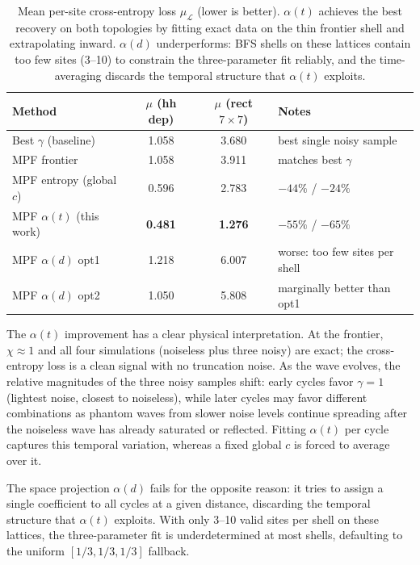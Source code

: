 \documentclass[12pt]{article}
\begin{document}
\begin{table}[h]
\centering
\begin{tabular}{lccl}
\toprule
Method & $\mu$ (hh dep) & $\mu$ (rect $7{\times}7$) & Notes \\
\midrule
Best $\gamma$ (baseline)   & 1.058 & 3.680 & best single noisy sample \\
MPF frontier               & 1.058 & 3.911 & matches best $\gamma$ \\
MPF entropy (global $c$)   & 0.596 & 2.783 & $-44\%$ / $-24\%$ \\
MPF $\alpha(t)$ (this work)& \textbf{0.481} & \textbf{1.276} & $-55\%$ / $-65\%$ \\
MPF $\alpha(d)$ opt1       & 1.218 & 6.007 & worse: too few sites per shell \\
MPF $\alpha(d)$ opt2       & 1.050 & 5.808 & marginally better than opt1 \\
\bottomrule
\end{tabular}
\caption{Mean per-site cross-entropy loss $\mu_\mathcal{L}$ (lower is better).
$\alpha(t)$ achieves the best recovery on both topologies by fitting exact
data on the thin frontier shell and extrapolating inward.
$\alpha(d)$ underperforms: BFS shells on these lattices contain too few
sites (3--10) to constrain the three-parameter fit reliably, and the
time-averaging discards the temporal structure that $\alpha(t)$ exploits.}
\label{tab:alpha_comparison}
\end{table}

The $\alpha(t)$ improvement has a clear physical interpretation.
At the frontier, $\chi\approx1$ and all four simulations (noiseless plus
three noisy) are exact; the cross-entropy loss is a clean signal with no
truncation noise.
As the wave evolves, the relative magnitudes of the three noisy samples
shift: early cycles favor $\gamma=1$ (lightest noise, closest to noiseless),
while later cycles may favor different combinations as phantom waves from
slower noise levels continue spreading after the noiseless wave has already
saturated or reflected.
Fitting $\alpha(t)$ per cycle captures this temporal variation,
whereas a fixed global $c$ is forced to average over it.

The space projection $\alpha(d)$ fails for the opposite reason: it
tries to assign a single coefficient to all cycles at a given distance,
discarding the temporal structure that $\alpha(t)$ exploits.
With only 3--10 valid sites per shell on these lattices, the
three-parameter fit is underdetermined at most shells, defaulting to the
uniform $[1/3, 1/3, 1/3]$ fallback.
\end{document}
